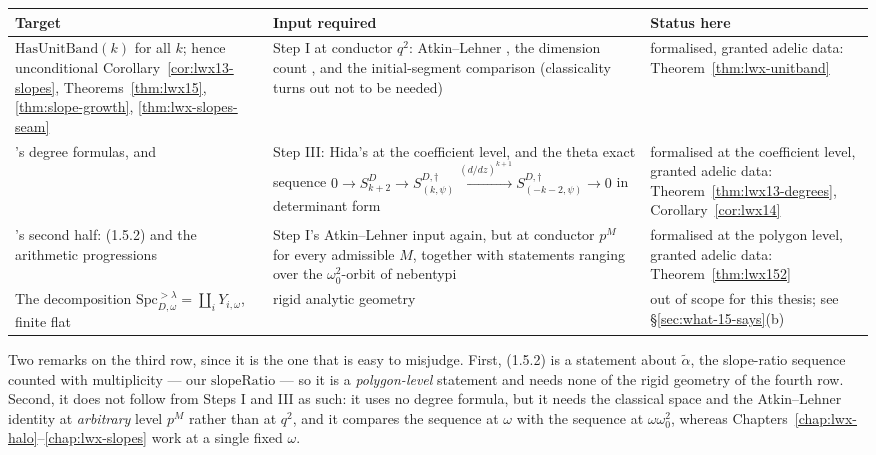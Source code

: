 \begin{center}
\small
\begin{tabular}{p{}p{}p{}}
  \hline
  \textbf{Target} & \textbf{Input required} & \textbf{Status here} \\
  \hline
  $\mathrm{HasUnitBand}(k)$ for all $k$; hence unconditional
    Corollary~\ref{cor:lwx13-slopes}, Theorems~\ref{thm:lwx15}, \ref{thm:slope-growth},
    \ref{thm:lwx-slopes-seam}
  & Step I at conductor $q^{2}$: Atkin--Lehner \cite[Prop.~3.22]{LWX}, the dimension count
    \cite[(3.21.1)]{LWX}, and the initial-segment comparison (classicality
    \cite[Prop.~2.15]{LWX} turns out not to be needed)
  & formalised, granted adelic data: Theorem~\ref{thm:lwx-unitband} \\
  \hline
  \cite[Thm.~1.3]{LWX}'s degree formulas, and \cite[Cor.~1.4]{LWX}
  & Step III: Hida's \cite[Cor.~3.21]{LWX} at the coefficient level, and the theta exact sequence
    $0 \to S^{D}_{k+2} \to S^{D,\dagger}_{(k,\psi)} \xrightarrow{(d/dz)^{k+1}}
     S^{D,\dagger}_{(-k-2,\psi)} \to 0$ in determinant form
  & formalised at the coefficient level, granted adelic data: Theorem~\ref{thm:lwx13-degrees},
    Corollary~\ref{cor:lwx14} \\
  \hline
  \cite[Thm.~1.5]{LWX}'s second half: (1.5.2) and the arithmetic progressions
  & Step I's Atkin--Lehner input again, but at conductor $p^{M}$ for every admissible $M$,
    together with statements ranging over the $\omega_0^{2}$-orbit of nebentypi
  & formalised at the polygon level, granted adelic data: Theorem~\ref{thm:lwx152} \\
  \hline
  The decomposition $\mathrm{Spc}^{>\lambda}_{D,\omega} = \coprod_i Y_{i,\omega}$, finite flat
  & rigid analytic geometry
  & out of scope for this thesis; see \S\ref{sec:what-15-says}(b) \\
  \hline
\end{tabular}
\end{center}

Two remarks on the third row, since it is the one that is easy to misjudge.  First, (1.5.2) is a
statement about $\tilde\alpha$, the slope-ratio sequence counted with multiplicity --- our
$\mathrm{slopeRatio}$ --- so it is a \emph{polygon-level} statement and needs none of the rigid
geometry of the fourth row.  Second, it does not follow from Steps I and III as such: it uses no
degree formula, but it needs the classical space and the Atkin--Lehner identity at
\emph{arbitrary} level $p^{M}$ rather than at $q^{2}$, and it compares the sequence at $\omega$
with the sequence at $\omega\omega_0^{2}$, whereas
Chapters~\ref{chap:lwx-halo}--\ref{chap:lwx-slopes} work at a single fixed $\omega$.

